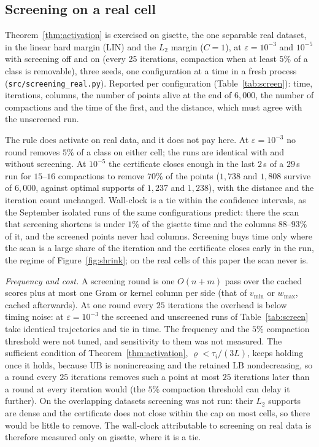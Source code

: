 \documentclass[pdflatex,sn-apa]{sn-jnl}%
\theoremstyle{thmstyleone}
\theoremstyle{thmstyletwo}
\newcommand{\UB}{\mathrm{UB}}
\newcommand{\LB}{\mathrm{LB}}
\begin{document}
\subsection{Screening on a real cell}\label{sec:screen-real}
Theorem~\ref{thm:activation} is exercised on gisette, the one separable
real dataset, in the linear hard margin (LIN) and the
$L_2$ margin ($C{=}1$), at $\varepsilon=10^{-3}$ and $10^{-5}$ with
screening off and on (every 25 iterations, compaction when at least
$5\%$ of a class is removable), three seeds, one configuration at a
time in a fresh process (\texttt{src/screening\_real.py}). Reported
per configuration (Table~\ref{tab:screen}): time, iterations,
columns, the number of points alive at the end of $6{,}000$, the number
of compactions and the time of the first, and the distance, which must
agree with the unscreened run.

The rule does activate on real data, and it does not pay here. At
$\varepsilon=10^{-3}$ no round removes $5\%$ of a class on either cell;
the runs are identical with and without screening. At $10^{-5}$ the
certificate closes enough in the last $2$\,s of a $29$\,s run for
$15$--$16$ compactions to remove $70\%$ of the points ($1{,}738$ and
$1{,}808$ survive of $6{,}000$, against optimal supports of $1{,}237$
and $1{,}238$), with the distance and the iteration count unchanged.
Wall-clock is a tie within the confidence intervals, as the September
isolated runs of the same configurations predict: there the scan that
screening shortens is under $1\%$ of the gisette time and the columns
$88$--$93\%$ of it, and the screened points never had
columns. Screening buys time only where the scan is a large share of
the iteration and the certificate closes early in the run, the regime
of Figure~\ref{fig:shrink}; on the real cells of this paper the scan
never is.

\emph{Frequency and cost.} A screening round is one $O(n+m)$ pass over
the cached scores plus at most one Gram or kernel column per side (that
of $v_{\min}$ or $w_{\max}$, cached afterwards). At one round every $25$
iterations the overhead is below timing noise: at $\varepsilon=10^{-3}$
the screened and unscreened runs of Table~\ref{tab:screen} take
identical trajectories and tie in time. The frequency and the $5\%$
compaction threshold were not tuned, and sensitivity to them was not
measured. The sufficient condition of Theorem~\ref{thm:activation},
$\varrho<\tau_i/(3L)$, keeps holding once it holds, because $\UB$ is
nonincreasing and the retained $\LB$ nondecreasing, so a round every $25$
iterations removes such a point at most $25$ iterations later than a
round at every iteration would (the $5\%$ compaction threshold can
delay it further). On the overlapping
datasets screening was not run: their $L_2$ supports are dense and the
certificate does not close within the cap on most cells, so there would
be little to remove. The wall-clock attributable to screening on real
data is therefore measured only on gisette, where it is a tie.
\end{document}
